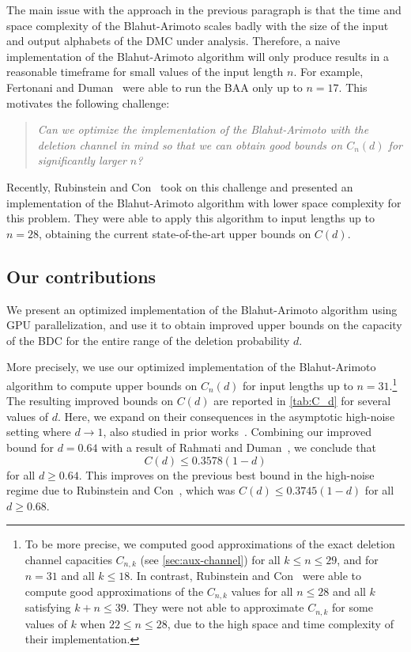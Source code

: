 \documentclass[11pt]{article}
\newcommand{\fCap}{C}
\begin{document}
The main issue with the approach in the previous paragraph is that the time and space complexity of the Blahut-Arimoto scales badly with the size of the input and output alphabets of the DMC under analysis.
Therefore, a naive implementation of the Blahut-Arimoto algorithm will only produce results in a reasonable timeframe for small values of the input length $n$. 
For example, Fertonani and Duman~\cite{FD10} were able to run the BAA only up to $n=17$.
This motivates the following challenge: 
\begin{quote}
    \em
    Can we optimize the implementation of the Blahut-Arimoto with the deletion channel in mind so that we can obtain good bounds on $\fCap_n(d)$ for significantly larger $n$?
\end{quote}

\noindent Recently, Rubinstein and Con~\cite{RC23} took on this challenge and presented an implementation of the Blahut-Arimoto algorithm with lower space complexity for this problem.
They were able to apply this algorithm to input lengths up to $n=28$, obtaining the current state-of-the-art upper bounds on $C(d)$.



\subsection{Our contributions}

We present an optimized implementation of the Blahut-Arimoto algorithm using GPU parallelization, and use it to obtain improved upper bounds on the capacity of the BDC for the entire range of the deletion probability $d$.

More precisely, we use our optimized implementation of the Blahut-Arimoto algorithm to compute upper bounds on $\fCap_n(d)$ for input lengths up to $n=31$.\footnote{To be more precise, we computed good approximations of the exact deletion channel capacities $C_{n,k}$ (see \cref{sec:aux-channel}) for all $k\leq n\leq 29$, and for $n=31$ and all $k\leq 18$. In contrast, Rubinstein and Con~\cite{RC23} were able to compute good approximations of the $C_{n,k}$ values for all $n\leq 28$ and all $k$ satisfying $k + n \leq 39$. They were not able to approximate $C_{n,k}$ for some values of $k$ when $22 \leq n \leq 28$, due to the high space and time complexity of their implementation.}
The resulting improved bounds on $C(d)$ are reported in \cref{tab:C_d} for several values of $d$.
Here, we expand on their consequences in the asymptotic high-noise setting where $d\to 1$, also studied in prior works~\cite{MD06,DMP07,FD10,Dal11,RD15,RC23}.
Combining our improved bound for $d=0.64$ with a result of Rahmati and Duman~\cite{RD15}, we conclude that
\begin{equation*}
    C(d)\leq 0.3578(1-d)
\end{equation*}
for all $d\geq 0.64$.
This improves on the previous best bound in the high-noise regime due to Rubinstein and Con~\cite{RC23}, which was $C(d)\leq 0.3745(1-d)$ for all $d\geq 0.68$.
\end{document}
